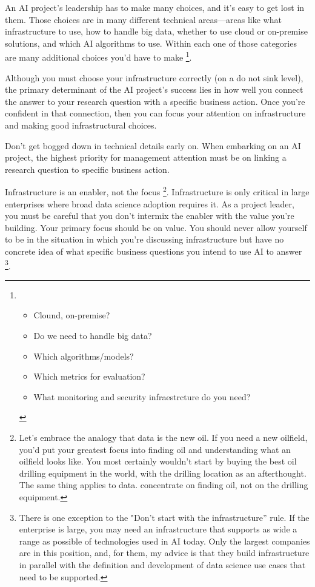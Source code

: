 An AI project's leadership has to make many choices, and it's
easy to get lost in them. Those choices are in many different
technical areas—areas like what infrastructure to use, how to
handle big data, whether to use cloud or on-premise solutions,
and which AI algorithms to use. Within each one of those
categories are many additional choices you'd have to make
\footnote{
    \begin{itemize}
        \item Clound, on-premise?
        \item Do we need to handle big data?
        \item Which algorithms/models?
        \item Which metrics for evaluation?
        \item What monitoring and security infraestrcture do
        you need?
    \end{itemize}
}.

Although you must choose your infrastructure correctly
(on a do not sink level), the primary determinant of the AI
project's success lies in how well you connect the answer to
your research question with a specific business action.
Once you're confident in that connection, then you can focus
your attention on infrastructure and making good infrastructural
choices.

Don't get bogged down in technical details early on.
When embarking on an AI project, the highest priority for
management attention must be on linking a research question
to specific business action.

Infrastructure is an enabler, not the focus
\footnote{
    Let's embrace the analogy that data is the new oil. If you
    need a new oilfield, you'd put your greatest focus into
    finding oil and understanding what an oilfield looks like.
    You most certainly wouldn't start by buying the best oil
    drilling equipment in the world, with the drilling location
    as an afterthought. The same thing applies to data.
    concentrate on finding oil, not on the drilling equipment.
}. Infrastructure is only critical in large enterprises where
broad data science adoption requires it. As a project leader,
you must be careful that you don't intermix the enabler with
the value you're building. Your primary focus should be on
value. You should never allow yourself to be in the situation
in which you're discussing infrastructure but have no concrete
idea of what specific business questions you intend to use AI
to answer
\footnote{
    There is one exception to the "Don't start with the
    infrastructure” rule. If the enterprise is large, you may
    need an infrastructure that supports as wide a range as
    possible of technologies used in AI today. Only the largest
    companies are in this position, and, for them, my advice is
    that they build infrastructure in parallel with the
    definition and development of data science use cases that
    need to be supported.
}.


